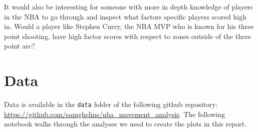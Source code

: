 \documentclass[]{article}
\begin{document}
It would also be interesting for someone with more in depth knowledge of
players in the NBA to go through and inspect what factors specific
players scored high in. Would a player like Stephen Curry, the NBA MVP
who is known for his three point shooting, have high factor scores with
respect to zones outside of the three point arc?

\section{Data}\label{data-1}

Data is available in the \texttt{data} folder of the following github
repository: \url{https://github.com/samghelms/nba_movement_analysis}.
The following notebook walks through the analyses we used to create the
plots in this report.
\end{document}
